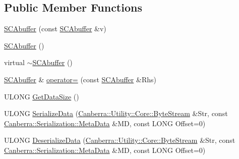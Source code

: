 \subsection*{Public Member Functions}
\begin{DoxyCompactItemize}
\item 
\hyperlink{class_canberra_1_1_data_types_1_1_spectroscopy_1_1_s_c_abuffer_a276c7d5483952f209b11e4d9d3a0831b_a276c7d5483952f209b11e4d9d3a0831b}{S\+C\+Abuffer} (const \hyperlink{class_canberra_1_1_data_types_1_1_spectroscopy_1_1_s_c_abuffer}{S\+C\+Abuffer} \&v)
\item 
\hyperlink{class_canberra_1_1_data_types_1_1_spectroscopy_1_1_s_c_abuffer_aec28b22d9a36de0cc737938a03695ffe_aec28b22d9a36de0cc737938a03695ffe}{S\+C\+Abuffer} ()
\item 
virtual \hyperlink{class_canberra_1_1_data_types_1_1_spectroscopy_1_1_s_c_abuffer_a68e955a3f5b7027ed9d227ba2b05e65c_a68e955a3f5b7027ed9d227ba2b05e65c}{$\sim$\+S\+C\+Abuffer} ()
\item 
\hyperlink{class_canberra_1_1_data_types_1_1_spectroscopy_1_1_s_c_abuffer}{S\+C\+Abuffer} \& \hyperlink{class_canberra_1_1_data_types_1_1_spectroscopy_1_1_s_c_abuffer_aeefc09dfec140406091d7ba28b2d40a2_aeefc09dfec140406091d7ba28b2d40a2}{operator=} (const \hyperlink{class_canberra_1_1_data_types_1_1_spectroscopy_1_1_s_c_abuffer}{S\+C\+Abuffer} \&Rhs)
\item 
U\+L\+O\+NG \hyperlink{class_canberra_1_1_data_types_1_1_spectroscopy_1_1_s_c_abuffer_a67d95b2a665bfdcc47311b748f5d7f08_a67d95b2a665bfdcc47311b748f5d7f08}{Get\+Data\+Size} ()
\item 
U\+L\+O\+NG \hyperlink{class_canberra_1_1_data_types_1_1_spectroscopy_1_1_s_c_abuffer_a69ecf3e8a638642932466bd4f1dae471_a69ecf3e8a638642932466bd4f1dae471}{Serialize\+Data} (\hyperlink{class_canberra_1_1_utility_1_1_core_1_1_byte_stream}{Canberra\+::\+Utility\+::\+Core\+::\+Byte\+Stream} \&Str, const \hyperlink{class_canberra_1_1_serialization_1_1_meta_data}{Canberra\+::\+Serialization\+::\+Meta\+Data} \&MD, const L\+O\+NG Offset=0)
\item 
U\+L\+O\+NG \hyperlink{class_canberra_1_1_data_types_1_1_spectroscopy_1_1_s_c_abuffer_a6e3c3bcb8ef561b6d67b1ba32f5d4840_a6e3c3bcb8ef561b6d67b1ba32f5d4840}{Deserialize\+Data} (\hyperlink{class_canberra_1_1_utility_1_1_core_1_1_byte_stream}{Canberra\+::\+Utility\+::\+Core\+::\+Byte\+Stream} \&Str, const \hyperlink{class_canberra_1_1_serialization_1_1_meta_data}{Canberra\+::\+Serialization\+::\+Meta\+Data} \&MD, const L\+O\+NG Offset=0)
\item 

\end{DoxyCompactItemize}

